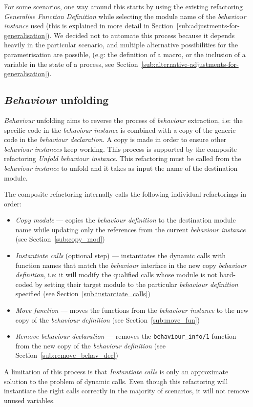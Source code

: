 For some scenarios, one way around this starts by using the existing
refactoring \emph{Generalise Function Definition} while selecting
the module name of the \emph{behaviour instance} used (this is explained
in more detail in Section~\ref{sub:adjustments-for-generalisation}).
We decided not to automate this process because it depends heavily
in the particular scenario, and multiple alternative possibilities
for the parametrisation are possible, (e.g: the definition of a macro,
or the inclusion of a variable in the state of a process, see 
Section~\ref{sub:alternative-adjustments-for-generalisation}).


\subsection{\emph{Behaviour} unfolding\label{sec:behaviour-unfolding}}

\emph{Behaviour} unfolding aims to reverse the process of \emph{behaviour}
extraction, i.e: the specific code in the \emph{behaviour instance}
is combined with a copy of the generic code in the \emph{behaviour
declaration}. A copy is made in order to ensure other \emph{behaviour
instances} keep working. This process is supported by the composite
refactoring \emph{Unfold behaviour instance}. This refactoring must
be called from the \emph{behaviour instance} to unfold and it takes
as input the name of the destination module.

The composite refactoring internally calls the following individual
refactorings in order:
\begin{itemize}
\item \emph{Copy module} --- copies the \emph{behaviour definition} to the
destination module name while updating only the references from the
current \emph{behaviour instance} (see Section~\ref{sub:copy_mod})
\item \emph{Instantiate calls} (optional step) --- instantiates the dynamic
calls with function names that match the \emph{behaviour} interface
in the new copy \emph{behaviour definition}, i.e: it will modify the
qualified calls whose module is not hard-coded by setting their target
module to the particular \emph{behaviour definition} specified (see
Section~\ref{sub:instantiate_calls})
\item \emph{Move function} --- moves the functions from the \emph{behaviour
instance} to the new copy of the \emph{behaviour definition} (see
Section~\ref{sub:move_fun})
\item \emph{Remove behaviour declaration} --- removes the \texttt{behaviour\_info/1}
function from the new copy of the \emph{behaviour definition} (see
Section~\ref{sub:remove_behav_dec})
\end{itemize}
A limitation of this process is that \emph{Instantiate calls} is only
an approximate solution to the problem of dynamic calls. Even though
this refactoring will instantiate the right calls correctly in the
majority of scenarios, it will not remove unused variables.

